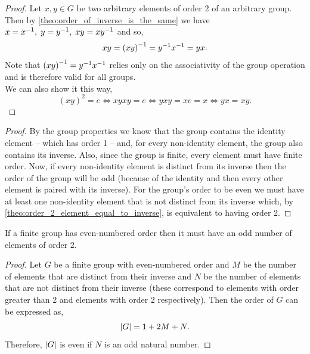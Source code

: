 \documentclass[MathsNotesBase.tex]{subfiles}
\begin{document}
{		
		\begin{proof}
			Let ${ x,y \in G }$ be two arbitrary elements of order 2 of an arbitrary group. Then by \autoref{theo:order_of_inverse_is_the_same} we have ${ x = {x}^{-1},\; y = {y}^{-1},\; xy = {xy}^{-1} }$ and so,
			\[ xy = {(xy)}^{-1} = {y}^{-1}{x}^{-1} = yx. \]
			Note that ${ {(xy)}^{-1} = {y}^{-1}{x}^{-1} }$ relies only on the associativity of the group operation and is therefore valid for all groups.\\
			We can also show it this way,
			\[ (xy)^2 = e \iff xyxy = e \iff yxy = xe = x \iff yx = xy. \]
		\end{proof}
	
		\begin{proof}
			By the group properties we know that the group contains the identity element -- which has order 1 -- and, for every non-identity element, the group also contains its inverse. Also, since the group is finite, every element must have finite order. Now, if every non-identity element is distinct from its inverse then the order of the group will be odd (because of the identity and then every other element is paired with its inverse). For the group's order to be even we must have at least one non-identity element that is not distinct from its inverse which, by \autoref{theo:order_2_element_equal_to_inverse}, is equivalent to having order 2.
		\end{proof}
		\begin{corollary}
			If a finite group has even-numbered order then it must have an odd number of elements of order 2.
		\end{corollary}
		\begin{proof}
			Let $G$ be a finite group with even-numbered order and $M$ be the number of elements that are distinct from their inverse and $N$ be the number of elements that are not distinct from their inverse (these correspond to elements with order greater than 2 and elements with order 2 respectively). Then the order of $G$ can be expressed as,
			\[ \left\lvert G\right\rvert = 1 + 2M + N. \]
			Therefore, ${ \left\lvert G\right\rvert }$ is even if $N$ is an odd natural number.
		\end{proof}
	
}
\end{document}
